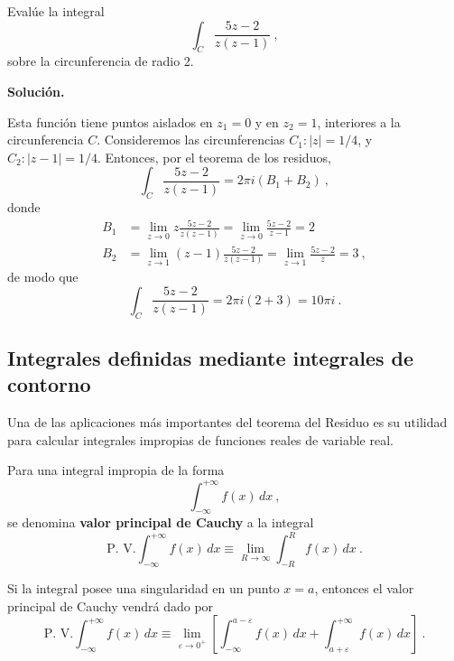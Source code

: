\begin{ejemplo}
    Evalúe la integral 
    \begin{equation*}
        \int_C \frac{5z-2}{z(z-1)} \ , 
    \end{equation*}
    sobre la circunferencia de radio 2.

    \noindent \textbf{Solución.}

    Esta función tiene puntos aislados en $z_1 = 0$ y en $z_2 = 1$, interiores a la circunferencia $C$. Consideremos las circunferencias $C_1 : |z| = 1/4$, y $C_2: |z-1| = 1/4$. Entonces, por el teorema de los residuos,
    \begin{equation*}
        \int_C \frac{5z-2}{z(z-1)} = 2\pi i \left( B_1 + B_2 \right) \ ,
    \end{equation*}
    donde 
    \begin{align*}
        B_1 & = \lim_{z \to 0} z \frac{5z-2}{z(z-1)} = \lim_{z \to 0} \frac{5z-2}{z-1} = 2 \\
        B_2 & = \lim_{z \to 1} (z-1) \frac{5z-2}{z(z-1)} = \lim_{z\to 1} \frac{5z-2}{z} = 3 \ ,
    \end{align*}
    de modo que
    \begin{equation*}
        \int_C \frac{5z-2}{z(z-1)} = 2\pi i (2 + 3) = 10 \pi i \ .
    \end{equation*}
\end{ejemplo}

\subsection{Integrales definidas mediante integrales de contorno}

Una de las aplicaciones más importantes del teorema del Residuo es su utilidad para calcular integrales impropias de funciones reales de variable real.

\begin{defi}
    Para una integral impropia de la forma
    \begin{equation*}
        \int_{-\infty}^{+\infty} f(x) \, dx \ ,
    \end{equation*}
    se denomina \textbf{valor principal de Cauchy} a la integral
    \begin{equation}
        \text{P. V.} \int_{-\infty}^{+\infty} f(x) \, dx \equiv \lim_{R \to \infty} \int_{-R}^{R} f(x) \, dx \ .
    \end{equation}

    Si la integral posee una singularidad en un punto $x=a$, entonces el valor principal de Cauchy vendrá dado por
    \begin{equation}
        \text{P. V.} \int_{-\infty}^{+\infty} f(x) \, dx \equiv \lim_{\varepsilon \to 0^+} \left[ \int_{-\infty}^{a-\varepsilon} f(x) \, dx + \int_{a + \varepsilon}^{+\infty} f(x) \, dx \right] \ .
    \end{equation}
\end{defi}

